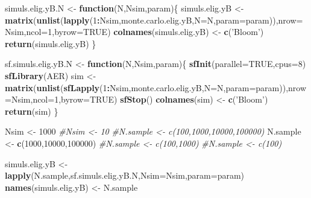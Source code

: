 \documentclass[]{book}
\newenvironment{Shaded}{\begin{snugshade}}{\end{snugshade}}
\newcommand{\CommentTok}[1]{\textcolor[rgb]{0.56,0.35,0.01}{\textit{#1}}}
\newcommand{\ControlFlowTok}[1]{\textcolor[rgb]{0.13,0.29,0.53}{\textbf{#1}}}
\newcommand{\DataTypeTok}[1]{\textcolor[rgb]{0.13,0.29,0.53}{#1}}
\newcommand{\DecValTok}[1]{\textcolor[rgb]{0.00,0.00,0.81}{#1}}
\newcommand{\KeywordTok}[1]{\textcolor[rgb]{0.13,0.29,0.53}{\textbf{#1}}}
\newcommand{\NormalTok}[1]{#1}
\newcommand{\OperatorTok}[1]{\textcolor[rgb]{0.81,0.36,0.00}{\textbf{#1}}}
\newcommand{\OtherTok}[1]{\textcolor[rgb]{0.56,0.35,0.01}{#1}}
\newcommand{\StringTok}[1]{\textcolor[rgb]{0.31,0.60,0.02}{#1}}
\theoremstyle{definition}
\theoremstyle{definition}
\theoremstyle{definition}
\theoremstyle{remark}
\begin{document}
\begin{Shaded}
\begin{Highlighting}[]
\NormalTok{simuls.elig.yB.N <-}\StringTok{ }\ControlFlowTok{function}\NormalTok{(N,Nsim,param)\{}
\NormalTok{  simuls.elig.yB <-}\StringTok{ }\KeywordTok{matrix}\NormalTok{(}\KeywordTok{unlist}\NormalTok{(}\KeywordTok{lapply}\NormalTok{(}\DecValTok{1}\OperatorTok{:}\NormalTok{Nsim,monte.carlo.elig.yB,}\DataTypeTok{N=}\NormalTok{N,}\DataTypeTok{param=}\NormalTok{param)),}\DataTypeTok{nrow=}\NormalTok{Nsim,}\DataTypeTok{ncol=}\DecValTok{1}\NormalTok{,}\DataTypeTok{byrow=}\OtherTok{TRUE}\NormalTok{)}
  \KeywordTok{colnames}\NormalTok{(simuls.elig.yB) <-}\StringTok{ }\KeywordTok{c}\NormalTok{(}\StringTok{'Bloom'}\NormalTok{)}
  \KeywordTok{return}\NormalTok{(simuls.elig.yB)}
\NormalTok{\}}

\NormalTok{sf.simuls.elig.yB.N <-}\StringTok{ }\ControlFlowTok{function}\NormalTok{(N,Nsim,param)\{}
  \KeywordTok{sfInit}\NormalTok{(}\DataTypeTok{parallel=}\OtherTok{TRUE}\NormalTok{,}\DataTypeTok{cpus=}\DecValTok{8}\NormalTok{)}
  \KeywordTok{sfLibrary}\NormalTok{(AER)}
\NormalTok{  sim <-}\StringTok{ }\KeywordTok{matrix}\NormalTok{(}\KeywordTok{unlist}\NormalTok{(}\KeywordTok{sfLapply}\NormalTok{(}\DecValTok{1}\OperatorTok{:}\NormalTok{Nsim,monte.carlo.elig.yB,}\DataTypeTok{N=}\NormalTok{N,}\DataTypeTok{param=}\NormalTok{param)),}\DataTypeTok{nrow=}\NormalTok{Nsim,}\DataTypeTok{ncol=}\DecValTok{1}\NormalTok{,}\DataTypeTok{byrow=}\OtherTok{TRUE}\NormalTok{)}
  \KeywordTok{sfStop}\NormalTok{()}
  \KeywordTok{colnames}\NormalTok{(sim) <-}\StringTok{ }\KeywordTok{c}\NormalTok{(}\StringTok{'Bloom'}\NormalTok{)}
  \KeywordTok{return}\NormalTok{(sim)}
\NormalTok{\}}

\NormalTok{Nsim <-}\StringTok{ }\DecValTok{1000}
\CommentTok{#Nsim <- 10}
\CommentTok{#N.sample <- c(100,1000,10000,100000)}
\NormalTok{N.sample <-}\StringTok{ }\KeywordTok{c}\NormalTok{(}\DecValTok{1000}\NormalTok{,}\DecValTok{10000}\NormalTok{,}\DecValTok{100000}\NormalTok{)}
\CommentTok{#N.sample <- c(100,1000)}
\CommentTok{#N.sample <- c(100)}

\NormalTok{simuls.elig.yB <-}\StringTok{ }\KeywordTok{lapply}\NormalTok{(N.sample,sf.simuls.elig.yB.N,}\DataTypeTok{Nsim=}\NormalTok{Nsim,}\DataTypeTok{param=}\NormalTok{param)}
\KeywordTok{names}\NormalTok{(simuls.elig.yB) <-}\StringTok{ }\NormalTok{N.sample}
\end{Highlighting}
\end{Shaded}
\end{document}
